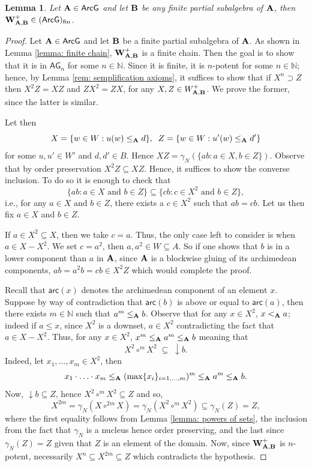 \documentclass{amsart}
\newtheorem{lemma}[theorem]{Lemma}
\theoremstyle{definition}
\numberwithin{equation}{section}
\newcommand{\alg}[1]{{\textbf{\upshape #1}}}  %
\newcommand{\vv}[1]{\mathsf {#1}}
\newcommand{\arc}[1]{{\vv{arc}}(#1)}
\newcommand{\BlockG}{\vv{ArcG}}
\newcommand{\BG}{\vv{AG}}
\begin{document}
\begin{lemma}\label{theorem: preparation to FMP}
Let $\alg A \in \BlockG$ and let $\alg B$ be any finite partial subalgebra of $\alg A$, then $\alg W_{\alg A, \alg B}^+\in (\BlockG)_{\rm fin}$. 
\end{lemma}
\begin{proof}
	Let $\alg A \in \BlockG$ and let $\alg B$ be a finite partial subalgebra of $\alg A$. As shown in Lemma \ref{lemma: finite chain}, $\alg W_{\alg A, \alg B}^+$ is a finite chain. Then the goal is to show that it is in $\BG_{n}$ for some $n \in \mathbb{N}$. Since it is finite, it is $n$-potent for some $n \in \mathbb{N}$; hence, by Lemma \ref{rem: semplification axioms}, it suffices to show that if $X^n \supset Z$ then $X^2 Z= X Z$ and $Z X^2= Z X$, for any $X, Z \in W_{\alg A, \alg B}^+$. We prove the former, since the latter is similar.
	
	 Let then $$X=\{w \in W : u (w ) \leq_{\alg A} d\}, \;\;Z=\{w \in W : u' (w )\leq_{\alg A} d'\}$$  for some $u, u' \in W'$ and $ d, d' \in B$. Hence $XZ=\gamma_N(\{ab : a \in X, b \in Z\})$. Observe that by order preservation $X^2Z \subseteq XZ$. Hence, it suffices to show the converse inclusion. To do so it is enough to check that $$\{ab : a \in X \mbox{ and } b \in Z \} \subseteq \{cb : c \in X^2 \mbox{ and } b \in Z \},$$ i.e., for any $ a \in X \mbox{ and } b \in Z $, there exists a $c \in X^2$ such that $ab=cb$. Let us then fix $a \in X$ and $b \in Z$.

 If $a \in X^2 \subseteq X$, then we take $c=a$. Thus, the only case left to consider is when $a \in X - X^2$. We set $c=a^2$, then $a,a^2 \in W \subseteq A$. So if one shows that $b$ is in a lower component than $a$ in $\alg A$, since $\alg A$ is a blockwise gluing of its archimedean components, $ab=a^2b=cb \in X^2 Z$ which would complete the proof. 
 
 Recall that $\arc x$ denotes the archimedean component of an element $x$. Suppose by way of contradiction that $\arc b$ is above or equal to $\arc a$, then there exists $m \in \mathbb{N}$ such that $a^m \leq_{\alg A} b$. Observe that for any $x \in X^2$, $x <_{\alg A} a$; indeed  if $a \leq x$, since $X^2$ is a downset, $a \in X^2$ contradicting the fact that $a \in X- X^2$. Thus, for any $x \in X^2$, $x^m \leq_{\alg A} a^m \leq_{\alg A} b$ meaning that 
 $$X^2 \circ^m X^2\;\subseteq\; {\downarrow }b.$$
  Indeed, let $x_1, \dots ,x_m \in X^2$, then 
  $$x_1 \cdot \ldots \cdot x_m\leq_{\alg A }(\max\{x_i\}_{i=1, \dots ,m})^m\leq_{\alg A} a^m \leq_{\alg A} b.$$
   Now, ${\downarrow} b \subseteq Z$, hence $X^2 \circ^m X^2\subseteq Z$ and so, 
   $$X^{2m}=\gamma_N(X \circ^{2m} X)=\gamma_N(X^2 \circ^m X^2) \subseteq \gamma_N(Z)=Z,$$ 
   where the first equality follows from Lemma \ref{lemma: powers of sets}, the inclusion from the fact that $\gamma_N$ is a nucleus hence order preserving, and the last since $\gamma_N(Z)=Z$ given that $Z$ is an element of the domain. Now, since $\alg W_{\alg A, \alg B}^+$ is $n$-potent, necessarily $X^n \subseteq X^{2m}\subseteq Z$ which contradicts the hypothesis. 
   

\end{proof}
\end{document}
